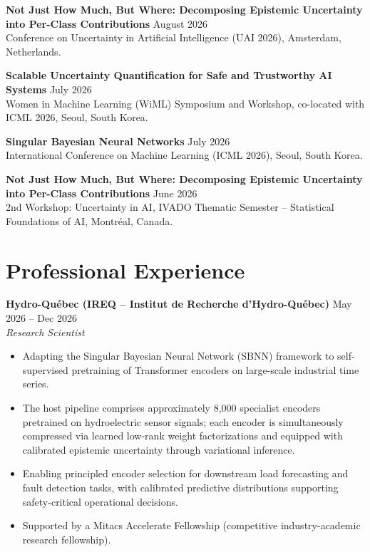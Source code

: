 \documentclass[10pt, a4paper]{article}
\newcommand{\entry}[4]{
    \vspace{0.15em}
    \noindent \textbf{#1} \hfill #2 \\
    {\small \textit{#3}}
    \begin{itemize}[leftmargin=1.2em, nosep, label=\tiny$\bullet$, itemsep=1pt]
        #4
    \end{itemize}
}
\begin{document}
\vspace{0.3em}
\noindent \textbf{Not Just How Much, But Where: Decomposing Epistemic Uncertainty into Per-Class Contributions} \hfill August 2026 \\
{\small Conference on Uncertainty in Artificial Intelligence (UAI 2026), Amsterdam, Netherlands.}

\vspace{0.3em}
\noindent \textbf{Scalable Uncertainty Quantification for Safe and Trustworthy AI Systems} \hfill July 2026 \\
{\small Women in Machine Learning (WiML) Symposium and Workshop, co-located with ICML 2026, Seoul, South Korea.}

\vspace{0.3em}
\noindent \textbf{Singular Bayesian Neural Networks} \hfill July 2026 \\
{\small International Conference on Machine Learning (ICML 2026), Seoul, South Korea.}

\vspace{0.3em}
\noindent \textbf{Not Just How Much, But Where: Decomposing Epistemic Uncertainty into Per-Class Contributions} \hfill June 2026 \\
{\small 2nd Workshop: Uncertainty in AI, IVADO Thematic Semester -- Statistical Foundations of AI, Montréal, Canada.}
\section{Professional Experience}

\entry{Hydro-Qu\'ebec (IREQ -- Institut de Recherche d'Hydro-Qu\'ebec)}{May 2026 -- Dec 2026}
{Research Scientist \normalfont{(Mitacs Accelerate Fellow)}}
{
    \item Adapting the Singular Bayesian Neural Network (SBNN) framework to self-supervised pretraining of Transformer encoders on large-scale industrial time series.
    \item The host pipeline comprises approximately 8{,}000 specialist encoders pretrained on hydroelectric sensor signals; each encoder is simultaneously compressed via learned low-rank weight factorizations and equipped with calibrated epistemic uncertainty through variational inference.
    \item Enabling principled encoder selection for downstream load forecasting and fault detection tasks, with calibrated predictive distributions supporting safety-critical operational decisions.
    \item Supported by a Mitacs Accelerate Fellowship (competitive industry-academic research fellowship).
}
\end{document}
